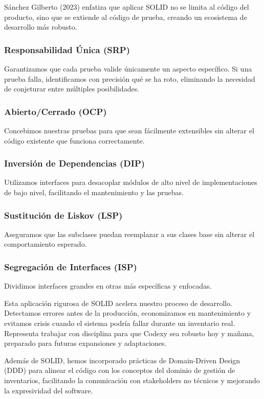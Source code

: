 Sánchez Gilberto (2023) enfatiza que aplicar SOLID no se limita al código del producto, sino que se extiende al código de prueba, creando un ecosistema de desarrollo más robusto.

\subsubsection{Responsabilidad Única (SRP)}

Garantizamos que cada prueba valide únicamente un aspecto específico. Si una prueba falla, identificamos con precisión qué se ha roto, eliminando la necesidad de conjeturar entre múltiples posibilidades.

\subsubsection{Abierto/Cerrado (OCP)}

Concebimos nuestras pruebas para que sean fácilmente extensibles sin alterar el código existente que funciona correctamente.

\subsubsection{Inversión de Dependencias (DIP)}

Utilizamos interfaces para desacoplar módulos de alto nivel de implementaciones de bajo nivel, facilitando el mantenimiento y las pruebas.

\subsubsection{Sustitución de Liskov (LSP)}

Aseguramos que las subclases puedan reemplazar a sus clases base sin alterar el comportamiento esperado.

\subsubsection{Segregación de Interfaces (ISP)}

Dividimos interfaces grandes en otras más específicas y enfocadas.

Esta aplicación rigurosa de SOLID acelera nuestro proceso de desarrollo. Detectamos errores antes de la producción, economizamos en mantenimiento y evitamos crisis cuando el sistema podría fallar durante un inventario real. Representa trabajar con disciplina para que Codexy sea robusto hoy y mañana, preparado para futuras expansiones y adaptaciones.

Además de SOLID, hemos incorporado prácticas de Domain-Driven Design (DDD) para alinear el código con los conceptos del dominio de gestión de inventarios, facilitando la comunicación con stakeholders no técnicos y mejorando la expresividad del software.